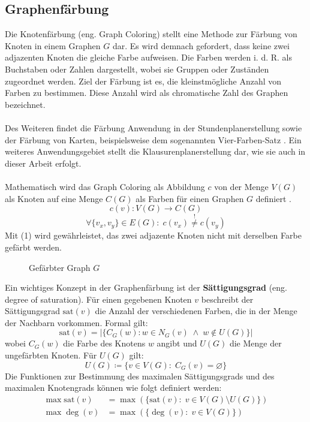 \subsection{Graphenfärbung}
Die Knotenfärbung (eng. Graph Coloring) stellt eine Methode zur Färbung von Knoten in einem Graphen $G$ dar. 
Es wird demnach gefordert, dass keine zwei adjazenten Knoten die gleiche Farbe aufweisen.
Die Farben werden i. d. R. als Buchstaben oder Zahlen dargestellt, wobei sie Gruppen oder Zuständen zugeordnet werden.
Ziel der Färbung ist es, die kleinstmögliche Anzahl von Farben zu bestimmen.
Diese Anzahl wird als chromatische Zahl des Graphen bezeichnet.\\\\
Des Weiteren findet die Färbung Anwendung in der Stundenplanerstellung sowie der Färbung von Karten, beispielsweise dem sogenannten Vier-Farben-Satz \parencite{LdM_2017_VFS}.
Ein weiteres Anwendungsgebiet stellt die Klausurenplanerstellung dar, wie sie auch in dieser Arbeit erfolgt.\\\\
\newpage
\noindent Mathematisch wird das Graph Coloring als Abbildung $c$ von der Menge $V(G)$ als Knoten auf eine Menge $C(G)$ als Farben für einen Graphen $G$ definiert \parencite[121]{Diestel2017-bj}.
\begin{equation*}
c(v): V(G) \rightarrow C(G)
\end{equation*}
\begin{equation}
\forall \{v_x,v_y\} \in E(G) \colon \; c(v_x) \overset{!}{\neq} c(v_y)
\end{equation}
Mit (1) wird gewährleistet, das zwei adjazente Knoten nicht mit derselben Farbe gefärbt werden.
\vspace{-2.25cm}
\begin{figure}[H]
    \centering
    
    \vspace{-2cm}
    \caption{Gefärbter Graph $G$}
\end{figure}
\noindent Ein wichtiges Konzept in der Graphenfärbung ist der \textbf{Sättigungsgrad} (eng. degree of saturation). 
Für einen gegebenen Knoten $v$ beschreibt der Sättigungsgrad $\text{sat}(v)$ die Anzahl der verschiedenen Farben, die in der Menge der Nachbarn vorkommen. Formal gilt: 
\parencite[39]{lewis2021guide}
\begin{equation*}
    \text{sat}(v)=|\{C_G(w)\colon w \in N_G(v) \; \wedge \; w \notin U(G)\}|
\end{equation*}
wobei $C_G(w)$ die Farbe des Knotens $w$ angibt und $U(G)$ die Menge der ungefärbten Knoten. Für $U(G)$ gilt:
\begin{equation*}
    U(G)\coloneqq \{v \in V(G) \colon \;C_G(v) = \varnothing\}
\end{equation*}
Die Funktionen zur Bestimmung des maximalen Sättigungsgrads und des maximalen Knotengrads können wie folgt definiert werden:
\begin{align*}
    \max \text{sat}(v) &= \max(\{\text{sat}(v)\colon \; v \in V(G) \setminus U(G)\})\\
    \max \deg(v) &= \max(\{\deg(v) \colon \; v \in V(G)\})
\end{align*}
